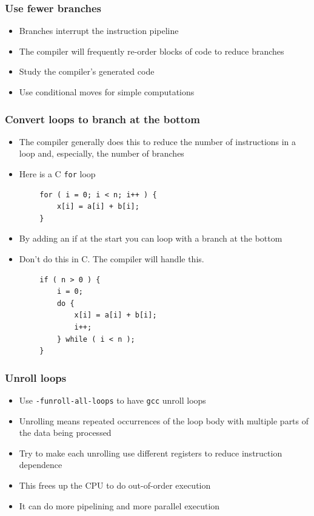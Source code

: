 \documentclass{beamer}
\begin{document}
\begin{frame}
    \frametitle{Use fewer branches}
    \begin{itemize}
        \item Branches interrupt the instruction pipeline
        \item The compiler will frequently re-order blocks of code to
              reduce branches
        \item Study the compiler's generated code
        \item Use conditional moves for simple computations
    \end{itemize}

\end{frame}

\begin{frame}[fragile]
    \frametitle{Convert loops to branch at the bottom}
    \begin{itemize}
        \item The compiler generally does this to reduce the number of instructions
              in a loop and, especially, the number of branches
        \item Here is a C {\tt for} loop
    \end{itemize}
\begin{verbatim}
        for ( i = 0; i < n; i++ ) {
            x[i] = a[i] + b[i];
        }
\end{verbatim}

    \begin{itemize}
        \item By adding an if at the start you can loop with a branch at the bottom
        \item Don't do this in C.  The compiler will handle this.
    \end{itemize}
\begin{verbatim}
        if ( n > 0 ) {
            i = 0;
            do {
                x[i] = a[i] + b[i];
                i++;
            } while ( i < n );
        }
\end{verbatim}
\end{frame}


\begin{frame}
    \frametitle{Unroll loops}
    \begin{itemize}
        \item Use {\tt -funroll-all-loops} to have {\tt gcc} unroll loops
        \item Unrolling means repeated occurrences of the loop body with
              multiple parts of the data being processed
        \item Try to make each unrolling use different registers to
              reduce instruction dependence
        \item This frees up the CPU to do out-of-order execution
        \item It can do more pipelining and more parallel execution
    \end{itemize}
\end{frame}
\end{document}
